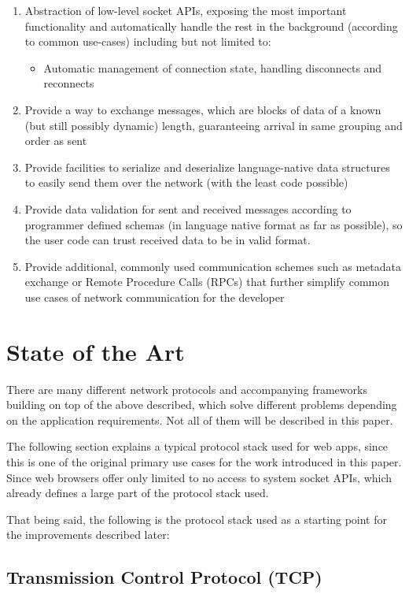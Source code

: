 \documentclass[conference]{IEEEtran}
\begin{document}
\begin{enumerate}
    \item Abstraction of low-level socket APIs, exposing the most important functionality and automatically handle the rest in the background (according to common use-cases) including but not limited to:
    \begin{itemize}
        \item Automatic management of connection state, handling disconnects and reconnects
    \end{itemize}
    \item Provide a way to exchange messages, which are blocks of data of a known (but still possibly dynamic) length, guaranteeing arrival in same grouping and order as sent
    \item Provide facilities to serialize and deserialize language-native data structures to easily send them over the network (with the least code possible)
    \item Provide data validation for sent and received messages according to programmer defined schemas (in language native format as far as possible), so the user code can trust received data to be in valid format.
    \item Provide additional, commonly used communication schemes such as metadata exchange or Remote Procedure Calls (RPCs) that further simplify common use cases of network communication for the developer
\end{enumerate}


\section{State of the Art}

There are many different network protocols and accompanying frameworks building on top of the above described, which solve different problems depending on the application requirements. Not all of them will be described in this paper.

The following section explains a typical protocol stack used for web apps, since this is one of the original primary use cases for the work introduced in this paper. Since web browsers offer only limited to no access to system socket APIs, which already defines a large part of the protocol stack used.

That being said, the following is the protocol stack used as a starting point for the improvements described later:

\subsection{Transmission Control Protocol (TCP)}
\end{document}
